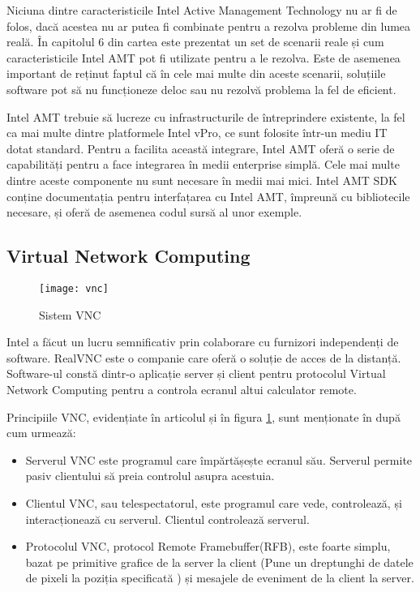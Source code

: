 Niciuna dintre caracteristicile Intel Active Management Technology nu ar fi de folos, dacă acestea nu ar putea fi combinate pentru a rezolva probleme din lumea reală. În capitolul 6 din cartea \cite{carte-amt} este prezentat un set de scenarii reale și cum caracteristicile Intel AMT pot fi utilizate pentru a le rezolva. Este de asemenea important de reținut faptul că în cele mai multe din aceste scenarii, soluțiile software pot să nu funcționeze deloc sau nu rezolvă problema la fel de eficient.

Intel AMT trebuie să lucreze cu infrastructurile de întreprindere existente, la fel ca mai multe dintre platformele Intel vPro, ce sunt folosite într-un mediu IT dotat standard. Pentru a facilita această integrare, Intel AMT oferă o serie de capabilități pentru a face integrarea în medii enterprise simplă. Cele mai multe dintre aceste componente nu sunt necesare în medii mai mici. Intel AMT SDK conține documentația pentru interfațarea cu Intel AMT, împreună cu bibliotecile necesare, și oferă de asemenea codul sursă al unor exemple.


\subsection{Virtual Network Computing}

\begin{figure}
    \centering
    \texttt{[image: vnc]}
    \caption{Sistem VNC}
    \label{vnc}
\end{figure}


Intel a făcut un lucru semnificativ prin colaborare cu furnizori independenți de software. RealVNC este o companie care oferă o soluție de acces de la distanță. Software-ul constă dintr-o aplicație server și client pentru protocolul Virtual Network Computing pentru a controla ecranul altui calculator remote. 

Principiile VNC, evidențiate în articolul \cite{vnc} și în figura \ref{vnc}, sunt menționate în \cite{vnc-guide} după cum urmează:

\begin{itemize} 
  \item Serverul VNC este programul care împărtășește ecranul său. Serverul permite pasiv clientului să preia controlul asupra acestuia.
  \item Clientul VNC, sau telespectatorul, este programul care vede, controlează, și interacționează cu serverul. Clientul controlează serverul.
  \item Protocolul VNC, protocol Remote Framebuffer(RFB), este foarte simplu, bazat pe primitive grafice de la server la client (Pune un dreptunghi de datele de pixeli la poziția specificată \cite{rfb}) și mesajele de eveniment de la client la server.
\end{itemize}

